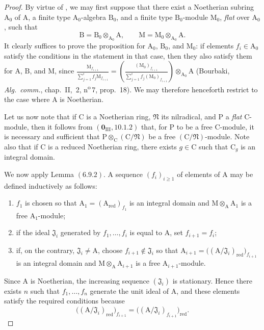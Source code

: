 \begin{proof}
By virtue of , we may first suppose that there exist a Noetherian subring $\mathrm{A}_0$ of $\mathrm{A}$, a finite type $\mathrm{A}_0$-algebra $\mathrm{B}_0$, and a finite type $\mathrm{B}_0$-module $\mathrm{M}_0$, \emph{flat} over $\mathrm{A}_0$, such that
\[
  \mathrm{B}=\mathrm{B}_0\otimes_{\mathrm{A}_0}\mathrm{A},
  \qquad
  \mathrm{M}=\mathrm{M}_0\otimes_{\mathrm{A}_0}\mathrm{A}.
\]
It clearly suffices to prove the proposition for $\mathrm{A}_0$, $\mathrm{B}_0$, and $\mathrm{M}_0$: if elements $f_i\in\mathrm{A}_0$ satisfy the conditions in the statement in that case, then they also satisfy them for $\mathrm{A}$, $\mathrm{B}$, and $\mathrm{M}$, since $\frac{\mathrm{M}_{f_{i+1}}}
{\sum_{j=1}^{i}f_j\mathrm{M}_{f_{i+1}}}
=
\left(
\frac{(\mathrm{M}_0)_{f_{i+1}}}
{\sum_{j=1}^{i}f_j(\mathrm{M}_0)_{f_{i+1}}}
\right)\otimes_{\mathrm{A}_0}\mathrm{A}$
(Bourbaki, \emph{Alg.\ comm.}, chap.~II, \textsection\,2, n\textsuperscript{o}\,7, prop.~18). We may therefore henceforth restrict to the case where $\mathrm{A}$ is Noetherian.

Let us now note that if $\mathrm{C}$ is a Noetherian ring, $\mathfrak{N}$ its nilradical, and $\mathrm{P}$ a \emph{flat} $\mathrm{C}$-module, then it follows from $(\mathbf{0}_{\mathrm{III}},10.1.2)$ that, for $\mathrm{P}$ to be a free $\mathrm{C}$-module,  it is necessary and sufficient that $\mathrm{P}\otimes_\mathrm{C}(\mathrm{C}/\mathfrak{N})$ be a free $(\mathrm{C}/\mathfrak{N})$-module. Note also that if $\mathrm{C}$ is a reduced Noetherian ring, there exists $g\in\mathrm{C}$ such that $\mathrm{C}_g$ is an integral domain.

We now apply Lemma $(6.9.2)$. A sequence $(f_i)_{i\geqslant1}$ of elements of $\mathrm{A}$ may be defined inductively as follows:
\begin{enumerate}
\item[$1^\circ$] $f_1$ is chosen so that $\mathrm{A}_1=(\mathrm{A}_{\mathrm{red}})_{f_1}$
is an integral domain and $\mathrm{M}\otimes_\mathrm{A}\mathrm{A}_1$ is a free $\mathrm{A}_1$-module;
\item[$2^\circ$] if the ideal $\mathfrak{J}_i$ generated by $f_1,\ldots,f_i$ is equal to $\mathrm{A}$, set $f_{i+1}=f_i$;
\item[$3^\circ$] if, on the contrary, $\mathfrak{J}_i\neq\mathrm{A}$, choose $f_{i+1}\notin\mathfrak{J}_i$ so that $\mathrm{A}_{i+1}
=\bigl((\mathrm{A}/\mathfrak{J}_i)_{\mathrm{red}}\bigr)_{f_{i+1}}$
is an integral domain and $\mathrm{M}\otimes_\mathrm{A}\mathrm{A}_{i+1}$ is a free $\mathrm{A}_{i+1}$-module.
\end{enumerate}
Since $\mathrm{A}$ is Noetherian, the increasing sequence $(\mathfrak{J}_i)$ is stationary. Hence there exists $n$ such that $f_1,\ldots,f_n$ generate the unit ideal of $\mathrm{A}$, and these elements satisfy the required conditions because
\[
  \bigl((\mathrm{A}/\mathfrak{J}_i)_{\mathrm{red}}\bigr)_{f_{i+1}}
  =
  \bigl((\mathrm{A}/\mathfrak{J}_i)_{f_{i+1}}\bigr)_{\mathrm{red}}.
\]
\end{proof}

